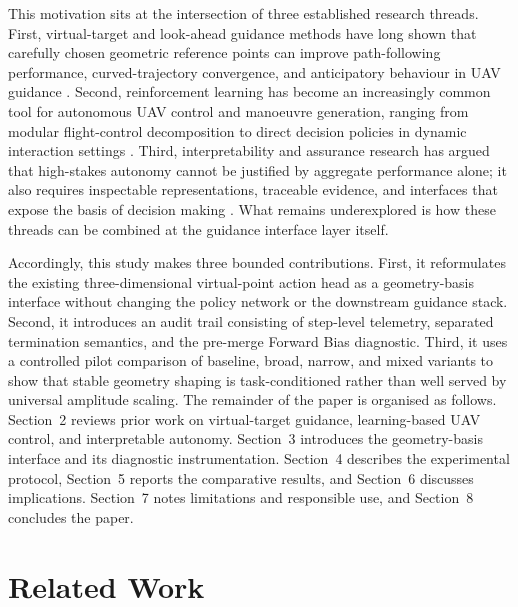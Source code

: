 \documentclass[drones,article,submit,pdftex,moreauthors]{Definitions/mdpi}
\begin{document}
This motivation sits at the intersection of three established research threads. First, virtual-target and look-ahead guidance methods have long shown that carefully chosen geometric reference points can improve path-following performance, curved-trajectory convergence, and anticipatory behaviour in UAV guidance \cite{park2007,ratnoo2015,breivik2005}. Second, reinforcement learning has become an increasingly common tool for autonomous UAV control and manoeuvre generation, ranging from modular flight-control decomposition to direct decision policies in dynamic interaction settings \cite{choi2023,quan2026,wang2023aerospace}. Third, interpretability and assurance research has argued that high-stakes autonomy cannot be justified by aggregate performance alone; it also requires inspectable representations, traceable evidence, and interfaces that expose the basis of decision making \cite{glanois2024,paterson2025,paleja2022}. What remains underexplored is how these threads can be combined at the guidance interface layer itself.

Accordingly, this study makes three bounded contributions. First, it reformulates the existing three-dimensional virtual-point action head as a geometry-basis interface without changing the policy network or the downstream guidance stack. Second, it introduces an audit trail consisting of step-level telemetry, separated termination semantics, and the pre-merge Forward Bias diagnostic. Third, it uses a controlled pilot comparison of baseline, broad, narrow, and mixed variants to show that stable geometry shaping is task-conditioned rather than well served by universal amplitude scaling. The remainder of the paper is organised as follows. Section~2 reviews prior work on virtual-target guidance, learning-based UAV control, and interpretable autonomy. Section~3 introduces the geometry-basis interface and its diagnostic instrumentation. Section~4 describes the experimental protocol, Section~5 reports the comparative results, and Section~6 discusses implications. Section~7 notes limitations and responsible use, and Section~8 concludes the paper.

\section{Related Work}
\end{document}
